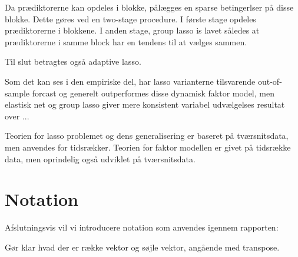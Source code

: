 Da prædiktorerne kan opdeles i blokke, pålægges en sparse betingerlser på disse blokke.
Dette gøres ved en two-stage procedure.
I første stage opdeles prædiktorerne i blokkene. I anden stage, group lasso \citep{group_lasso} is lavet således at prædiktorerne i samme block har en tendens til at vælges sammen.

Til slut betragtes også adaptive lasso.

Som det kan ses i den empiriske del, har lasso varianterne tilsvarende out-of-sample forcast og generelt outperformes disse dynamisk faktor model, men elastisk net og group lasso giver mere konsistent variabel udvælgelses resultat over ...





Teorien for lasso problemet og dens generalisering er baseret på tværsnitsdata, men anvendes for tidsrækker.
Teorien for faktor modellen er givet på tidsrække data, men oprindelig også udviklet på tværsnitsdata.



\section{Notation}
Afslutningsvis vil vi introducere notation som anvendes igennem rapporten:

Gør klar hvad der er række vektor og søjle vektor, angående med transpose.  
